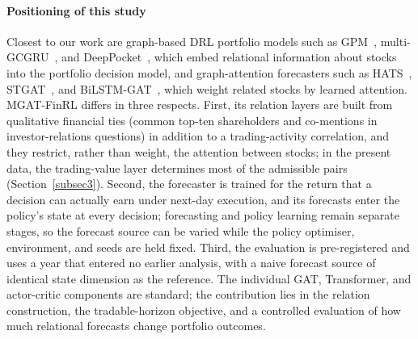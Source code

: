 {\color{blue}\paragraph{Positioning of this study}
Closest to our work are graph-based DRL portfolio models such as GPM~\citep{Si2022GPM}, multi-GCGRU~\citep{Liu2021MultiGCGRU}, and DeepPocket~\citep{Farzan2021DeepPocket}, which embed relational information about stocks into the portfolio decision model, and graph-attention forecasters such as HATS~\citep{Kim2019HATS}, STGAT~\citep{Feng2025STGAT}, and BiLSTM-GAT~\citep{Lu2025BiLSTMGAT}, which weight related stocks by learned attention. MGAT-FinRL differs in three respects. First, its relation layers are built from qualitative financial ties (common top-ten shareholders and co-mentions in investor-relations questions) in addition to a trading-activity correlation, and they restrict, rather than weight, the attention between stocks; in the present data, the trading-value layer determines most of the admissible pairs (Section~\ref{subsec3}). Second, the forecaster is trained for the return that a decision can actually earn under next-day execution, and its forecasts enter the policy's state at every decision; forecasting and policy learning remain separate stages, so the forecast source can be varied while the policy optimiser, environment, and seeds are held fixed. Third, the evaluation is pre-registered and uses a year that entered no earlier analysis, with a naive forecast source of identical state dimension as the reference. The individual GAT, Transformer, and actor-critic components are standard; the contribution lies in the relation construction, the tradable-horizon objective, and a controlled evaluation of how much relational forecasts change portfolio outcomes.\par}

